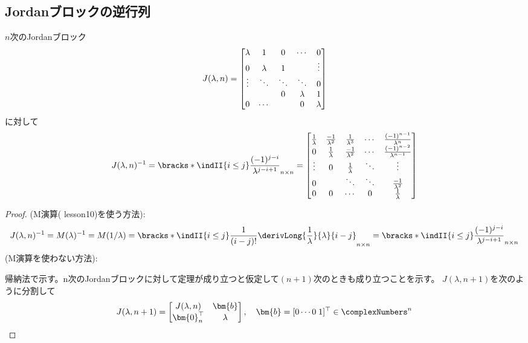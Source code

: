 {        \subsection{Jordanブロックの逆行列}
            \begin{shadebox}
                $n$次のJordanブロック
                \[J(\lambda, n) = \begin{bmatrix} \lambda & 1 & 0 & \cdots & 0\\0 & \lambda & 1 & & \vdots\\\vdots & \ddots & \ddots & \ddots & 0\\& & 0 & \lambda & 1\\0 & \cdots & & 0 & \lambda \end{bmatrix}\]
                に対して
                \[
                    J(\lambda,n)^{-1} = \bracks*{\indII{i\leq j}\frac{(-1)^{j-i}}{\lambda^{j-i+1}}}_{n\times n} =
                    \begin{bmatrix}
                        \frac{1}{\lambda} & \frac{-1}{\lambda^2} & \frac{1}{\lambda^3} & \cdots & \frac{(-1)^{n-1}}{\lambda^n} \\
                        0 & \frac{1}{\lambda} & \frac{-1}{\lambda^2} & \cdots & \frac{(-1)^{n-2}}{\lambda^{n-1}} \\
                        \vdots & 0 & \frac{1}{\lambda} & \ddots & \vdots \\
                        0 & & \ddots & \ddots & \frac{-1}{\lambda^2} \\
                        0 & 0 & \cdots & 0 & \frac{1}{\lambda}
                    \end{bmatrix}
                \]
                \end{shadebox}
                \begin{proof}
                    (M演算(\cite{現代線形代数入門} lesson10)を使う方法):
                    \[ J(\lambda,n)^{-1} = M(\lambda)^{-1} = M(1/\lambda) = \bracks*{\indII{i\leq j}\frac{1}{(i-j)!}\derivLong{\frac{1}{\lambda}}{\lambda}{i-j}}_{n\times n} = \bracks*{\indII{i\leq j}\frac{(-1)^{j-i}}{\lambda^{j-i+1}}}_{n\times n} \]
                    \newline
                    (M演算を使わない方法):
                    \par
                    帰納法で示す。n次のJordanブロックに対して定理が成り立つと仮定して$(n+1)$次のときも成り立つことを示す。
                    $J(\lambda,n+1)$を次のように分割して
                    \[
                        J(\lambda,n+1) =
                        \begin{bmatrix}
                            J(\lambda,n) & \bm{b} \\
                            \bm{0}_n^\top & \lambda
                        \end{bmatrix}
                        ,\quad
                        \bm{b} = [0\cdots0\;1]^\top \in \complexNumbers^n
                    \]

\end{proof}}
